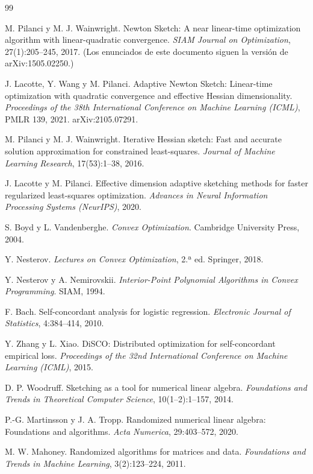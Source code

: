 \documentclass[11pt,a4paper,oneside]{book}
\theoremstyle{definition}
\theoremstyle{remark}
\begin{document}
\begin{thebibliography}{99}
\small

 M. Pilanci y M. J. Wainwright. Newton Sketch: A near linear-time optimization algorithm with
linear-quadratic convergence. \emph{SIAM Journal on Optimization}, 27(1):205--245, 2017. (Los enunciados de este
documento siguen la versión de arXiv:1505.02250.)

 J. Lacotte, Y. Wang y M. Pilanci. Adaptive Newton Sketch: Linear-time optimization with quadratic
convergence and effective Hessian dimensionality. \emph{Proceedings of the 38th International Conference on Machine
Learning (ICML)}, PMLR 139, 2021. arXiv:2105.07291.

 M. Pilanci y M. J. Wainwright. Iterative Hessian sketch: Fast and accurate solution approximation for
constrained least-squares. \emph{Journal of Machine Learning Research}, 17(53):1--38, 2016.

 J. Lacotte y M. Pilanci. Effective dimension adaptive sketching methods for faster regularized
least-squares optimization. \emph{Advances in Neural Information Processing Systems (NeurIPS)}, 2020.

 S. Boyd y L. Vandenberghe. \emph{Convex Optimization}. Cambridge University Press, 2004.

 Y. Nesterov. \emph{Lectures on Convex Optimization}, 2.ª ed. Springer, 2018.

 Y. Nesterov y A. Nemirovskii. \emph{Interior-Point Polynomial Algorithms in Convex Programming}. SIAM, 1994.

 F. Bach. Self-concordant analysis for logistic regression. \emph{Electronic Journal of Statistics},
4:384--414, 2010.

 Y. Zhang y L. Xiao. DiSCO: Distributed optimization for self-concordant empirical loss.
\emph{Proceedings of the 32nd International Conference on Machine Learning (ICML)}, 2015.

 D. P. Woodruff. Sketching as a tool for numerical linear algebra. \emph{Foundations and Trends in
Theoretical Computer Science}, 10(1--2):1--157, 2014.

 P.-G. Martinsson y J. A. Tropp. Randomized numerical linear algebra: Foundations and algorithms.
\emph{Acta Numerica}, 29:403--572, 2020.

 M. W. Mahoney. Randomized algorithms for matrices and data. \emph{Foundations and Trends in Machine
Learning}, 3(2):123--224, 2011.


\end{thebibliography}
\end{document}
